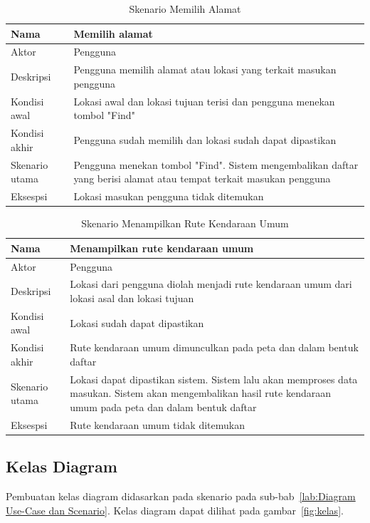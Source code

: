 \begin{table}[H]
	\centering
		\begin{tabular}{ |p{2cm}|p{10cm}| }
			\hline
			Nama &  Memilih alamat\\ \hline
			Aktor & Pengguna  \\ \hline
			Deskripsi & Pengguna memilih alamat atau lokasi yang terkait masukan pengguna \\ \hline
			Kondisi awal & Lokasi awal dan lokasi tujuan terisi dan pengguna menekan tombol "Find" \\ \hline
			Kondisi akhir & Pengguna sudah memilih dan lokasi sudah dapat dipastikan  \\ \hline
			Skenario utama & Pengguna menekan tombol "Find". Sistem mengembalikan daftar yang berisi alamat atau tempat terkait masukan pengguna \\ \hline
			Eksespsi & Lokasi masukan pengguna tidak ditemukan  \\ 
			\hline
		\end{tabular}
	\caption{Skenario Memilih Alamat}
	\label{tab:memilihAlamat}
\end{table}

\begin{table}[H]
	\centering
		\begin{tabular}{ |p{2cm}|p{10cm}| }
			\hline
			Nama &  Menampilkan rute kendaraan umum\\ \hline
			Aktor & Pengguna  \\ \hline
			Deskripsi & Lokasi dari pengguna diolah menjadi rute kendaraan umum dari lokasi asal dan lokasi tujuan \\ \hline
			Kondisi awal & Lokasi sudah dapat dipastikan \\ \hline
			Kondisi akhir & Rute kendaraan umum dimunculkan pada peta dan dalam bentuk daftar \\ \hline
			Skenario utama & Lokasi dapat dipastikan sistem. Sistem lalu akan memproses data masukan. Sistem akan mengembalikan hasil rute kendaraan umum pada peta dan dalam bentuk daftar \\ \hline
			Eksespsi & Rute kendaraan umum tidak ditemukan  \\ 
			\hline
		\end{tabular}
	\caption{Skenario Menampilkan Rute Kendaraan Umum}
	\label{tab:menampilkan}
\end{table}

\subsection{Kelas Diagram}
\label{lab:Kelas Diagram}
\hspace{0.5cm} Pembuatan kelas diagram didasarkan pada skenario pada sub-bab~\ref{lab:Diagram Use-Case dan Scenario}. Kelas diagram dapat dilihat pada gambar~\ref{fig:kelas}.

